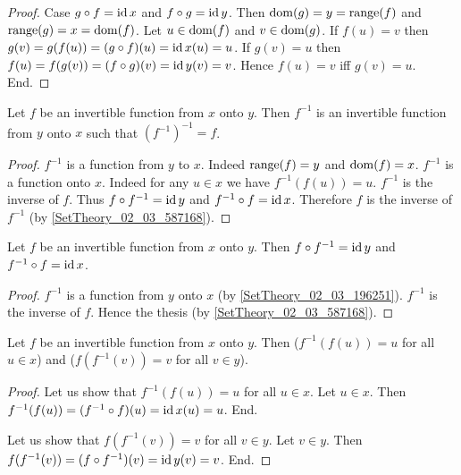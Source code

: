 \begin{forthel}
\begin{proof}
      Case $g \circ f = \operatorname{id}{x}$ and $f \circ g = \operatorname{id}{y}$.
        Then $\operatorname{dom}(g) = y = \operatorname{range}(f)$ and $\operatorname{range}(g) = x = \operatorname{dom}(f)$.
        Let $u \in \operatorname{dom}(f)$ and $v \in \operatorname{dom}(g)$.
        If $f(u) = v$ then $g(v) = g(f(u)) = (g \circ f)(u) = \operatorname{id}{x}(u) = u$.
        If $g(v) = u$ then $f(u) = f(g(v)) = (f \circ g)(v) = \operatorname{id}{y}(v) = v$.
        Hence $f(u) = v$ iff $g(v) = u$.
      End.
    \end{proof}

    \begin{proposition}\label{SetTheory_02_03_196251}
      Let $f$ be an invertible function from $x$ onto $y$.
      Then $f^{-1}$ is an invertible function from $y$ onto $x$ such that $(f^{-1})^{-1} = f$.
    \end{proposition}
    \begin{proof}
      $f^{-1}$ is a function from $y$ to $x$.
      Indeed $\operatorname{range}(f) = y$ and $\operatorname{dom}(f) = x$.
      $f^{-1}$ is a function onto $x$.
      Indeed for any $u \in x$ we have $f^{-1}(f(u)) = u$.
      $f^{-1}$ is the inverse of $f$.
      Thus $f \circ f^{-1} = \operatorname{id}{y}$ and $f^{-1} \circ f = \operatorname{id}{x}$.
      Therefore $f$ is the inverse of $f^{-1}$ (by \ref{SetTheory_02_03_587168}).
    \end{proof}

    \begin{proposition}\label{SetTheory_02_03_601485}
      Let $f$ be an invertible function from $x$ onto $y$.
      Then $f \circ f^{-1} = \operatorname{id}{y}$ and $f^{-1} \circ f = \operatorname{id}{x}$.
    \end{proposition}
    \begin{proof}
      $f^{-1}$ is a function from $y$ onto $x$ (by \ref{SetTheory_02_03_196251}).
      $f^{-1}$ is the inverse of $f$.
      Hence the thesis (by \ref{SetTheory_02_03_587168}).
    \end{proof}

    \begin{proposition}\label{SetTheory_02_03_173329}
      Let $f$ be an invertible function from $x$ onto $y$.
      Then ($f^{-1}(f(u)) = u$ for all $u \in x$) and ($f(f^{-1}(v)) = v$ for all $v \in y$).
    \end{proposition}
    \begin{proof}
      Let us show that  $f^{-1}(f(u)) = u$ for all $u \in x$.
        Let $u \in x$.
        Then $f^{-1}(f(u)) = (f^{-1} \circ f)(u) = \operatorname{id}{x}(u) = u$.
      End.

      Let us show that $f(f^{-1}(v)) = v$ for all $v \in y$.
        Let $v \in y$.
        Then $f(f^{-1}(v)) = (f \circ f^{-1})(v) = \operatorname{id}{y}(v) = v$.
      End.
    \end{proof}


\end{forthel}
